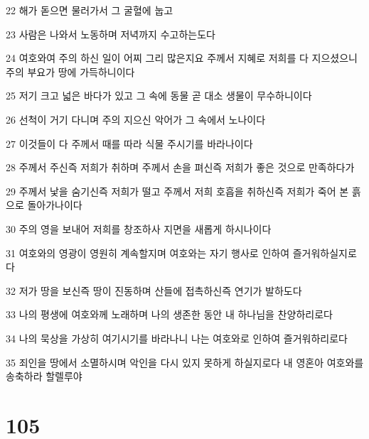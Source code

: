 \par 22 해가 돋으면 물러가서 그 굴혈에 눕고
\par 23 사람은 나와서 노동하며 저녁까지 수고하는도다
\par 24 여호와여 주의 하신 일이 어찌 그리 많은지요 주께서 지혜로 저희를 다 지으셨으니 주의 부요가 땅에 가득하니이다
\par 25 저기 크고 넓은 바다가 있고 그 속에 동물 곧 대소 생물이 무수하니이다
\par 26 선척이 거기 다니며 주의 지으신 악어가 그 속에서 노나이다
\par 27 이것들이 다 주께서 때를 따라 식물 주시기를 바라나이다
\par 28 주께서 주신즉 저희가 취하며 주께서 손을 펴신즉 저희가 좋은 것으로 만족하다가
\par 29 주께서 낯을 숨기신즉 저희가 떨고 주께서 저희 호흡을 취하신즉 저희가 죽어 본 흙으로 돌아가나이다
\par 30 주의 영을 보내어 저희를 창조하사 지면을 새롭게 하시나이다
\par 31 여호와의 영광이 영원히 계속할지며 여호와는 자기 행사로 인하여 즐거워하실지로다
\par 32 저가 땅을 보신즉 땅이 진동하며 산들에 접촉하신즉 연기가 발하도다
\par 33 나의 평생에 여호와께 노래하며 나의 생존한 동안 내 하나님을 찬양하리로다
\par 34 나의 묵상을 가상히 여기시기를 바라나니 나는 여호와로 인하여 즐거워하리로다
\par 35 죄인을 땅에서 소멸하시며 악인을 다시 있지 못하게 하실지로다 내 영혼아 여호와를 송축하라 할렐루야

\chapter{105}

